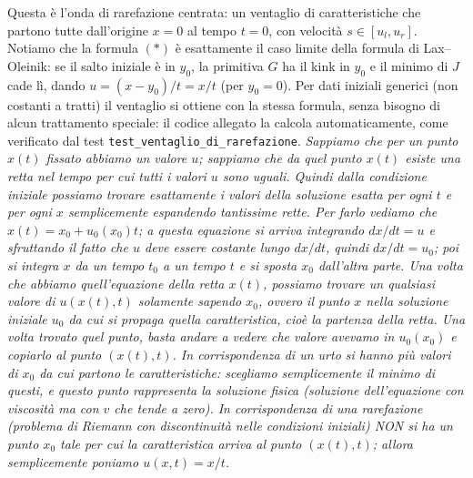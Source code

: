 \documentclass[12pt]{article}
\begin{document}
Questa è l'onda di rarefazione centrata: un ventaglio di caratteristiche che partono tutte dall'origine \(x=0\) al tempo \(t=0\), con velocità \(s\in[u_l,u_r]\). Notiamo che la formula \((*)\) è esattamente il caso limite della formula di Lax--Oleinik: se il salto iniziale è in \(y_0\), la primitiva \(G\) ha il kink in \(y_0\) e il minimo di \(J\) cade lì, dando \(u=(x-y_0)/t=x/t\) (per \(y_0=0\)). Per dati iniziali generici (non costanti a tratti) il ventaglio si ottiene con la stessa formula, senza bisogno di alcun trattamento speciale: il codice allegato la calcola automaticamente, come verificato dal test \texttt{test\_ventaglio\_di\_rarefazione}.
\newpage
\textit{Sappiamo che per un punto $x(t)$ fissato abbiamo un valore $u$; sappiamo che da quel punto $x(t)$ esiste una retta nel tempo per cui tutti i valori $u$ sono uguali. Quindi dalla condizione iniziale possiamo trovare esattamente i valori della soluzione esatta per ogni $t$ e per ogni $x$ semplicemente espandendo tantissime rette. Per farlo vediamo che $x(t)=x_0+u_0(x_0)t$; a questa equazione si arriva integrando $dx/dt = u$ e sfruttando il fatto che $u$ deve essere costante lungo $dx/dt$, quindi $dx/dt=u_0$; poi si integra $x$ da un tempo $t_0$ a un tempo $t$ e si sposta $x_0$ dall'altra parte. Una volta che abbiamo quell'equazione della retta $x(t)$, possiamo trovare un qualsiasi valore di $u(x(t),t)$ solamente sapendo $x_0$, ovvero il punto $x$ nella soluzione iniziale $u_0$ da cui si propaga quella caratteristica, cioè la partenza della retta. Una volta trovato quel punto, basta andare a vedere che valore avevamo in $u_0(x_0)$ e copiarlo al punto $(x(t),t)$. In corrispondenza di un urto si hanno più valori di $x_0$ da cui partono le caratteristiche: scegliamo semplicemente il minimo di questi, e questo punto rappresenta la soluzione fisica (soluzione dell'equazione con viscosità ma con $v$ che tende a zero). In corrispondenza di una rarefazione (problema di Riemann con discontinuità nelle condizioni iniziali) NON si ha un punto $x_0$ tale per cui la caratteristica arriva al punto $(x(t),t)$; allora semplicemente poniamo $u(x,t)=x/t$.}
\newpage
\end{document}
